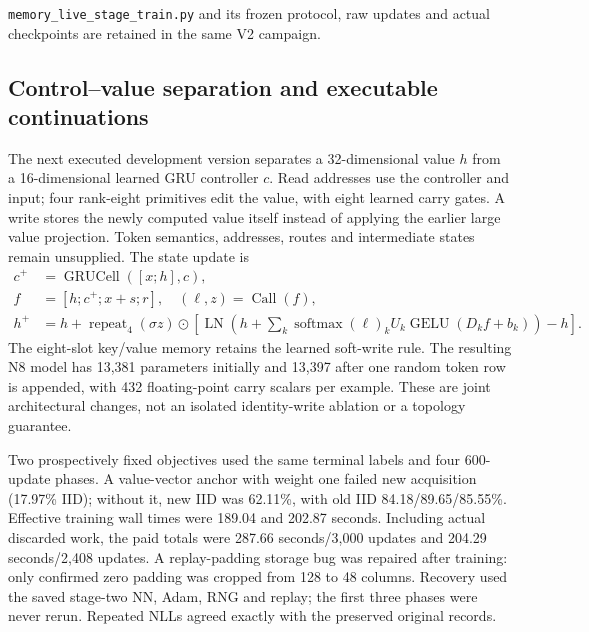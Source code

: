 \texttt{memory\_live\_stage\_train.py} and its frozen protocol,
raw updates and actual checkpoints are retained in the same V2 campaign.

\subsection{Control--value separation and executable continuations}
The next executed development version separates a 32-dimensional value $h$
from a 16-dimensional learned GRU controller $c$. Read addresses use the
controller and input; four rank-eight primitives edit the value, with eight
learned carry gates. A write stores the newly computed value itself instead
of applying the earlier large value projection. Token semantics, addresses,
routes and intermediate states remain unsupplied. The state update is
\begin{align}
c^+&=\operatorname{GRUCell}([x;h],c),\\
f&=[h;c^+;x+s;r],\quad (\ell,z)=\operatorname{Call}(f),\\
h^+&=h+\operatorname{repeat}_{4}(\sigma z)\odot
 \left[\operatorname{LN}\left(h+\sum_k\operatorname{softmax}(\ell)_k
 U_k\operatorname{GELU}(D_kf+b_k)\right)-h\right].
\end{align}
The eight-slot key/value memory retains the learned soft-write rule.
The resulting N8 model has 13,381 parameters initially and 13,397 after
one random token row is appended, with 432 floating-point carry scalars
per example. These are joint architectural changes, not an isolated
identity-write ablation or a topology guarantee.

Two prospectively fixed objectives used the same terminal labels and
four 600-update phases. A value-vector anchor with weight one failed
new acquisition (17.97\% IID); without it, new IID was 62.11\%, with old
IID 84.18/89.65/85.55\%. Effective training wall times were 189.04 and
202.87 seconds. Including actual discarded work, the paid totals were
287.66 seconds/3,000 updates and 204.29 seconds/2,408 updates.
A replay-padding storage bug was repaired after training: only confirmed
zero padding was cropped from 128 to 48 columns. Recovery used the saved
stage-two NN, Adam, RNG and replay; the first three phases were never
rerun. Repeated NLLs agreed exactly with the preserved original records.


